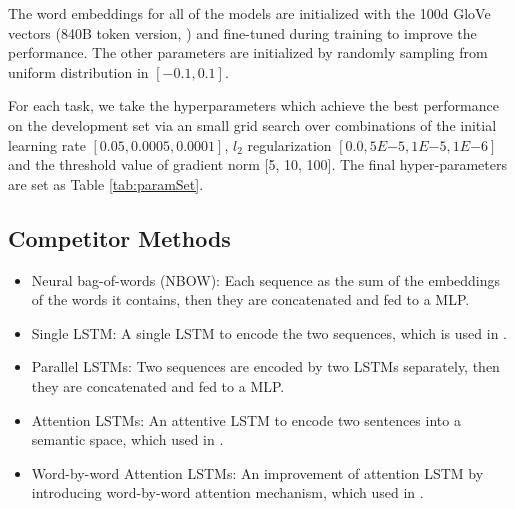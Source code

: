 \documentclass{article}
\begin{document}
The word embeddings for all of the models are initialized with the 100d GloVe vectors (840B token version, \cite{pennington2014glove}) and fine-tuned during training to improve the performance.
The other parameters are initialized by randomly sampling from uniform distribution in $[-0.1, 0.1]$.

For each task, we take the hyperparameters which achieve the best performance on the development set via an small grid search over combinations of the initial learning rate $[0.05, 0.0005, 0.0001]$, $l_2$ regularization $[0.0, 5E{-5}, 1E{-5}, 1E{-6}]$ and the threshold value of gradient norm [5, 10, 100].
The final hyper-parameters are set as Table \ref{tab:paramSet}.






\subsection{Competitor Methods}
\begin{itemize}
  \item Neural bag-of-words (NBOW): Each sequence as the sum of the embeddings of the words it contains, then they are concatenated and fed to a MLP.
  \item Single LSTM: A single LSTM to encode the two sequences, which is used in \cite{rocktaschel2015reasoning}.
  \item Parallel LSTMs: Two sequences are encoded by two LSTMs separately, then they are concatenated and fed to a MLP.

  \item Attention LSTMs: An attentive LSTM to encode two sentences into a semantic space, which used in \cite{rocktaschel2015reasoning}.
  \item Word-by-word Attention LSTMs: An improvement of attention LSTM by introducing word-by-word attention mechanism, which used in \cite{rocktaschel2015reasoning}.
\end{itemize}






\end{document}
